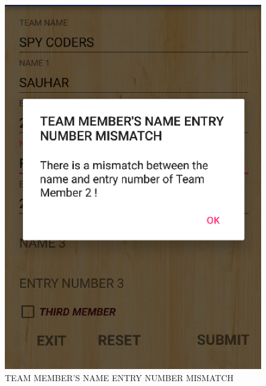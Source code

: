\documentclass[12pt]{article}
\begin{document}
\begin{itemize}
\begin{itemize}
\begin{figure}
	\centering
	\includegraphics[scale=.7]{TEAM_MEMBER'S_NAME_ENTRY_NUMBER_MISMATCH.png}
	\caption{TEAM MEMBER'S NAME ENTRY NUMBER MISMATCH}
\end{figure}


\end{itemize}
\end{itemize}
\end{document}
